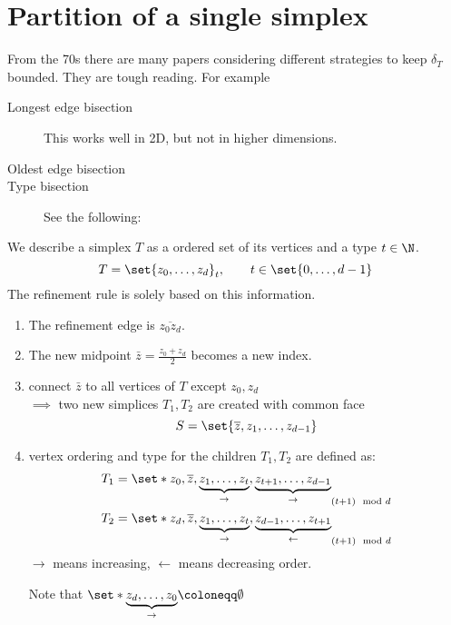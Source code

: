 \section{Partition of a single simplex}
From the 70s there are many papers considering different strategies to keep $\delta_T$ bounded. They are tough reading. For example
\begin{description}
  \item[Longest edge bisection] This works well in 2D, but not in higher dimensions.
  \item[Oldest edge bisection]
  \item[Type bisection] See the following:
\end{description}
\begin{definition}
	We describe a simplex $T$ as a ordered set of its vertices and a type $t\in \N$.
	\begin{equation*}
    T = \set{z_{0}, \dots , z_{d}}_{t}, \qquad t\in \set{0,\dots ,d-1}
	\end{equation*}
	The refinement rule is solely based on this information.
	\begin{enumerate}[label = \arabic*)]
		\item The refinement edge is $\overline{z_{0}z_{d}}$.
		\item The new midpoint $\bar{z}= \frac{z_{0} + z_{d}}{2}$ becomes a new index.
		\item connect $\bar{z}$ to all vertices of $T$ except $z_{0},z_{d}$ \\
			$\implies$ two new simplices $T_{1},T_{2}$ are created with common face
			 \begin{equation*}
         S = \set{\overline{z},z_{1},\dots ,z_{d-1} }
     \end{equation*}
		\item vertex ordering and type for the children $T_{1},T_{2}$ are defined as:
			\begin{align*}
        T_{1}&= \set*{ z_{0},\overline{z},\underbrace{z_{1},\dots ,z_{t}}_{\rightarrow},\underbrace{z_{t+1},\dots ,z_{d-1}}_{{\rightarrow}}}_{(t+1)\mod d}\\
				T_{2}&= \set*{ z_{d},\overline{z},\underbrace{z_{1},\dots ,z_{t}}_{\rightarrow},\underbrace{z_{d-1},\dots ,z_{t+1}}_{{\leftarrow}}}_{(t+1)\mod d}\\
			\end{align*}
		$\rightarrow$ means increasing, $\leftarrow$ means decreasing order.

    Note that $\set*{\underbrace{z_{d},\dots ,z_{0}}_{\rightarrow}} \coloneqq \emptyset$
	\end{enumerate}
\end{definition}
